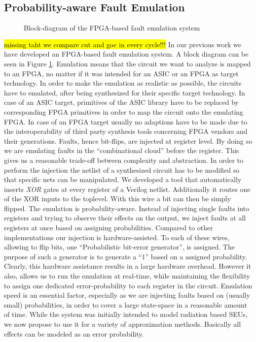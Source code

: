 \documentclass[conference]{IEEEtran}
\begin{document}
\subsection{Probability-aware Fault Emulation}
\begin{figure}[htb]
  \centering
  \caption{Block-diagram of the FPGA-based fault emulation system}
  \label{fig:faultify_block}
\end{figure}
\hl{missing taht we compare cut and goc in every cycle!!!}
In our previous work we have developed an FPGA-based fault emulation system. A block diagram can be seen in Figure \ref{fig:faultify_block}. Emulation means that the circuit we want to analyze is mapped to an FPGA, no matter if it was intended for an ASIC or an FPGA as target technology. In order to make the emulation as realistic as possible, the circuits have to emulated, after being synthesized for their specific target technology. In case of an ASIC target, primitives of the ASIC library have to be replaced by corresponding FPGA primitives in order to map the circuit onto the emulating FPGA. In case of an FPGA target usually no adaptions have to be made due to the interoperability of third party synthesis tools concerning FPGA vendors and their generations. Faults, hence bit-flips, are injected at register level. By doing so we are emulating faults in the ``combinational cloud'' before the register. This gives us a reasonable trade-off between complexity and abstraction. In order to perform the injection the netlist of a synthesized circuit has to be modified so that specific nets can be manipulated. We developed a tool that automatically inserts \emph{XOR} gates at every register of a Verilog netlist. Additionally it routes one of the XOR inputs to the toplevel. With this wire a bit can then be simply flipped. The emulation is probability-aware. Instead of injecting single faults into registers and trying to observe their effects on the output, we inject faults at all registers at once based on assigning probabilities. Compared to other implementations our injection is hardware-assisted. To each of these wires, allowing to flip bits, one ``Probabilistic bit-error generator'', is assigned. The purpose of such a generator is to generate a ``1'' based on a assigned probability. Clearly, this hardware assistance results in a large hardware overhead. However it also, allows us to run the emulation at real-time, while maintaining the flexibility to assign one dedicated error-probability to each register in the circuit. Emulation speed is an essential factor, especially as we are injecting faults based on (usually small) probabilities, in order to cover a large state-space in a reasonable amount of time. While the system was initially intended to model radiation based SEUs, we now propose to use it for a variety of approximation methods. Basically all effects can be modeled as an error probability.
\end{document}
